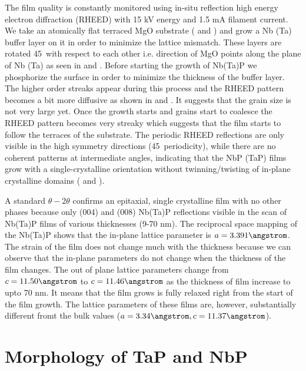 The film quality is constantly monitored using in-situ reflection high energy electron diffraction 
(RHEED) with 15 kV energy and 1.5 mA filament current. We take an atomically flat terraced MgO 
substrate ( and ) and grow a Nb (Ta) buffer layer on it 
in order to minimize the lattice mismatch. These layers are rotated 45\degree\ with respect to 
each other i.e.  direction of MgO points along the  plane of Nb (Ta) 
as seen in  and . Before starting the growth of Nb(Ta)P 
we phosphorize the surface in order to minimize the thickness of the buffer layer. The higher 
order streaks appear during this process and the RHEED pattern becomes a bit more diffusive as 
shown in  and . It suggests that the grain 
size is not very large yet. Once the growth starts and grains start to coalesce the RHEED pattern 
becomes very streaky which suggests that the film starts to follow the terraces of the substrate. 
The periodic RHEED reflections are only visible in the high symmetry directions (45\degree\ 
periodicity), while there are no coherent patterns at intermediate angles, indicating that the 
NbP (TaP) films grow with a single-crystalline orientation without twinning/twisting of in-plane 
crystalline domains (\tref{rheed-NbP-100} and \tref{rheed-NbP-110}).

A standard $\theta - 2\theta$ confirms an epitaxial, single crystalline film with no other phases
because only (004) and (008) Nb(Ta)P reflections visible in the scan of Nb(Ta)P films of 
various thicknesses (9-70 nm). The reciprocal space mapping of the Nb(Ta)P shows that the in-plane
lattice parameter is $a=3.391 \angstrom$. The strain of the film does not change much with the thickness
because we can observe that the in-plane parameters do not change when the thickness of the film
changes. The out of plane lattice parameters change from $c=11.50 \angstrom$ to $c=11.46 \angstrom$
as the thickness of film increase to upto 70 nm. It means that the film grows is fully relaxed right
from the start of the film growth. The lattice parameters of these films are, however, substantially different fromt the
bulk values ($a=3.34 \angstrom, c=11.37 \angstrom$).

\section{Morphology of TaP and NbP}


